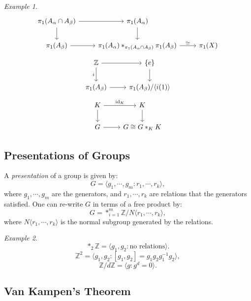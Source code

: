 \documentclass[a4paper]{report}
\theoremstyle{definition}
\theoremstyle{remark}
\theoremstyle{proposition}
\theoremstyle{conjecture}
\theoremstyle{lemma}
\theoremstyle{corollary}
\theoremstyle{exercise}
\newtheorem{example}{Example}
\begin{document}
\begin{example}
    $$\begin{tikzcd}
    \pi_1(A_\alpha \cap A_\beta) \arrow[r] \arrow[d] & \pi_1(A_\alpha) \arrow[d]                                                             &          \\
    \pi_1(A_\beta) \arrow[r]                         & \pi_1(A_\alpha) \ast_{\pi_1(A_\alpha\cap A_\beta)} \pi_1(A_\beta) \arrow[r, "\simeq"] & \pi_1(X)
    \end{tikzcd}$$
    $$\begin{tikzcd}
    \mathbb{Z} \arrow[r] \arrow[d, "i"'] & \lbrace e \rbrace \arrow[d]        \\
    \pi_1(A_\beta) \arrow[r]             & \pi_1(A_\beta)/\langle i(1)\rangle
    \end{tikzcd}$$
    $$\begin{tikzcd}
    K \arrow[r, "\operatorname{id}_K"] \arrow[d] & K \arrow[d]        \\
    G \arrow[r]                                  & G \cong G \ast_K K
    \end{tikzcd}$$
\end{example}

\subsection{Presentations of Groups}

A \emph{presentation} of a group is given by:
$$G = \langle g_1,\cdots, g_m : r_1,\cdots,r_k\rangle,$$
where $g_1,\cdots, g_m$ are the generators, and 
$r_1,\cdots,r_k$ are relations that the generators satisfied.
One can re-write $G$ in terms of a free product by:
$$G = \ast_{i=1}^m \mathbb{Z}/ N\langle r_1,\cdots,r_k\rangle,$$
where $N\langle r_1,\cdots,r_k\rangle$ is the normal subgroup
generated by the relations.

\begin{example}
    $$\ast_2\mathbb{Z} = \langle g_1,g_2 : \text{no relations}\rangle.$$
    $$\mathbb{Z}^2 = \langle g_1,g_2 : [g_1,g_2] = g_1g_2g_1^{-1}g_2\rangle,$$
    $$\mathbb{Z}/d\mathbb{Z} = \langle g : g^d = 0\rangle.$$
\end{example}

\subsection{Van Kampen's Theorem}
\end{document}
